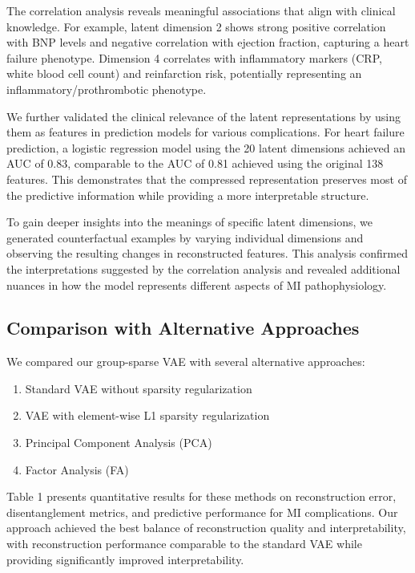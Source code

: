 \documentclass[oupdraft]{bio}
\begin{document}
The correlation analysis reveals meaningful associations that align with clinical knowledge. For example, latent dimension 2 shows strong positive correlation with BNP levels and negative correlation with ejection fraction, capturing a heart failure phenotype. Dimension 4 correlates with inflammatory markers (CRP, white blood cell count) and reinfarction risk, potentially representing an inflammatory/prothrombotic phenotype.

We further validated the clinical relevance of the latent representations by using them as features in prediction models for various complications. For heart failure prediction, a logistic regression model using the 20 latent dimensions achieved an AUC of 0.83, comparable to the AUC of 0.81 achieved using the original 138 features. This demonstrates that the compressed representation preserves most of the predictive information while providing a more interpretable structure.

To gain deeper insights into the meanings of specific latent dimensions, we generated counterfactual examples by varying individual dimensions and observing the resulting changes in reconstructed features. This analysis confirmed the interpretations suggested by the correlation analysis and revealed additional nuances in how the model represents different aspects of MI pathophysiology.

\subsection{Comparison with Alternative Approaches}

We compared our group-sparse VAE with several alternative approaches:
\begin{enumerate}
    \item Standard VAE without sparsity regularization
    \item VAE with element-wise L1 sparsity regularization
    \item Principal Component Analysis (PCA)
    \item Factor Analysis (FA)
\end{enumerate}

Table 1 presents quantitative results for these methods on reconstruction error, disentanglement metrics, and predictive performance for MI complications. Our approach achieved the best balance of reconstruction quality and interpretability, with reconstruction performance comparable to the standard VAE while providing significantly improved interpretability.
\end{document}
